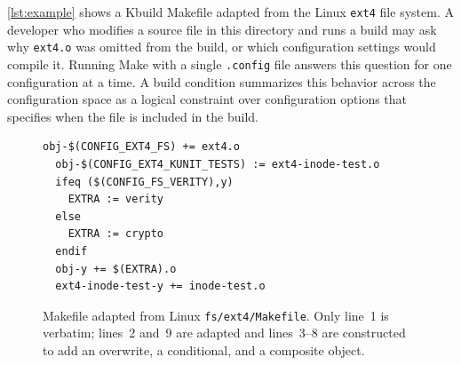 \documentclass[acmsmall,screen,review,anonymous,nonacm]{acmart}
\begin{document}
  \autoref{lst:example} shows a Kbuild Makefile adapted from the Linux \texttt{ext4} file system.
  A developer who modifies a source file in this directory and runs a build may ask why \texttt{ext4.o} was omitted from the build, or which configuration settings would compile it.
  Running Make with a single \texttt{.config} file answers this question for one configuration at a time.
  A build condition summarizes this behavior across the configuration space as a logical constraint over configuration options that specifies when the file is included in the build.

  \begin{figure}[t]
  \begin{lstlisting}[style=kbuild]
  obj-$(CONFIG_EXT4_FS) += ext4.o
  obj-$(CONFIG_EXT4_KUNIT_TESTS) := ext4-inode-test.o
  ifeq ($(CONFIG_FS_VERITY),y)
    EXTRA := verity
  else
    EXTRA := crypto
  endif
  obj-y += $(EXTRA).o
  ext4-inode-test-y += inode-test.o
  \end{lstlisting}
  \caption{Makefile adapted from Linux \texttt{fs/ext4/Makefile}. Only line~1 is verbatim; lines~2 and~9 are adapted and lines~3--8 are constructed to add an overwrite, a conditional, and a composite object.}
  \label{lst:example}
  \end{figure}
\end{document}
